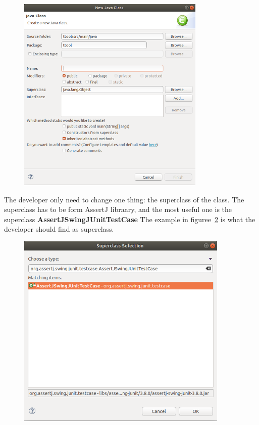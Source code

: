 \documentclass[12pt]{article}
\begin{document}
\begin{figure}[H]
\begin{center}
\includegraphics[width=0.8\textwidth]{images/image16.png}
\end{center}
\caption{}
\label{fig:image15}
\end{figure}

The developer only need to change one thing: the superclass of the class. The superclass has to be form AssertJ libraary, and the most useful one is the superclass \textbf{AssertJSwingJUnitTestCase} \newline
The example in figuree~\ref{fig:image16} is what the developer should find as superclass.

\begin{figure}[H]
\begin{center}
\includegraphics[width=0.9\textwidth]{images/image17.png}
\end{center}
\caption{}
\label{fig:image16}
\end{figure}
\end{document}
